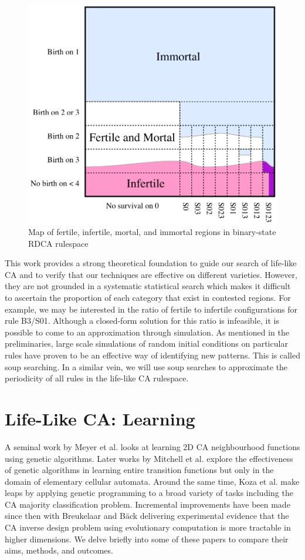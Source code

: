 \begin{figure}[!h]
\centering
    \includegraphics[width=.5\textwidth]{images/eppstein-map.png}
    \caption{Map of fertile, infertile, mortal, and immortal regions in binary-state RDCA rulespace \cite{eppstein2010growth}}
\label{fig:eppstein-map}
\end{figure}

This work provides a strong theoretical foundation to guide our search of life-like CA and to verify that our techniques are effective on different varieties. However, they are not grounded in a systematic statistical search which makes it difficult to ascertain the proportion of each category that exist in contested regions. For example, we may be interested in the ratio of fertile to infertile configurations for rule B3/S01. Although a closed-form solution for this ratio is infeasible, it is possible to come to an approximation through simulation. As mentioned in the preliminaries, large scale simulations of random initial conditions on particular rules have proven to be an effective way of identifying new patterns\cite{flammenkamp}. This is called soup searching. In a similar vein, we will use soup searches to approximate the periodicity of all rules in the life-like CA rulespace.

\section{Life-Like CA: Learning}

A seminal work by Meyer et al.\cite{meyer1989learning} looks at learning 2D CA neighbourhood functions using genetic algorithms. Later works by Mitchell et al.\cite{mitchell1996evolving} explore the effectiveness of genetic algorithms in learning entire transition functions but only in the domain of elementary cellular automata. Around the same time, Koza et al. make leaps by applying genetic programming to a broad variety of tasks including the CA majority classification problem\cite{andre1996discovery}. Incremental improvements have been made since then with Breukelaar and B{\"a}ck\cite{breukelaar2005using} delivering experimental evidence that the CA inverse design problem using evolutionary computation is more tractable in higher dimensions. We delve briefly into some of these papers to compare their aims, methods, and outcomes.

